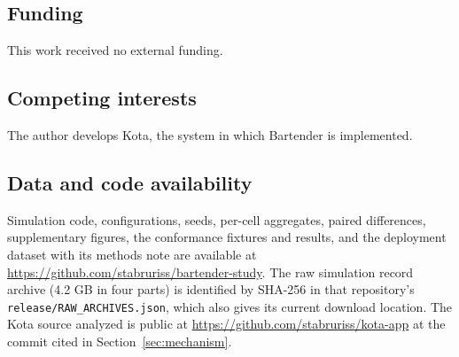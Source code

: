 \documentclass[pdflatex,sn-mathphys-ay]{sn-jnl}
\theoremstyle{thmstyleone}
\theoremstyle{thmstylethree}
\begin{document}
\subsection*{Funding}
This work received no external funding.
\subsection*{Competing interests}
The author develops Kota, the system in which Bartender is implemented.
\subsection*{Data and code availability}
Simulation code, configurations, seeds, per-cell aggregates, paired differences, supplementary figures, the conformance fixtures and results, and the deployment dataset with its methods note are available at \url{https://github.com/stabruriss/bartender-study}. The raw simulation record archive (4.2 GB in four parts) is identified by SHA-256 in that repository's \texttt{release/RAW\_ARCHIVES.json}, which also gives its current download location. The Kota source analyzed is public at \url{https://github.com/stabruriss/kota-app} at the commit cited in Section~\ref{sec:mechanism}.
\end{document}
